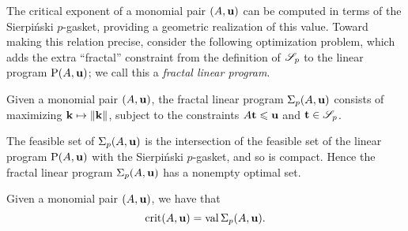 \documentclass[11pt]{amsart}
\begin{document}
The critical exponent of a monomial pair $(A, \mathbf{u})$ can be computed in terms of the Sierpi\'nski $p$-gasket, providing a geometric realization of this value.
Toward making this relation precise, consider the following optimization problem, which adds the extra ``fractal'' constraint from the definition of $\mathscr{S}_p$ to 
the linear program $\mathrm{P}(A, \mathbf{u})$; we call this a \emph{fractal linear program}.

\begin{definition}
Given a monomial pair $(A, \mathbf{u})$, the fractal linear program $\Sigma_p(A,\mathbf{u})$ consists of maximizing $\mathbf{k}\mapsto \| \mathbf{k} \|$, subject to the constraints $A\mathbf{t}\leqslant \mathbf{u}$ and $\mathbf{t}\in \mathscr{S}_p$.
\end{definition}

\begin{remark}
The feasible set of $\Sigma_p(A, \mathbf{u})$ is the intersection of the feasible set of the linear program $\mathrm{P}(A, \mathbf{u})$ with the Sierpi\'nski $p$-gasket, and so is compact.  Hence the fractal linear program $\Sigma_p(A, \mathbf{u})$ has a nonempty optimal set.
\end{remark}

\begin{proposition}  
Given a monomial pair $(A, \mathbf{u})$, we have that 
\[\operatorname{crit}(A,\mathbf{u}) = \operatorname{val}\Sigma_p(A,\mathbf{u}).\]
\end{proposition}
\end{document}
